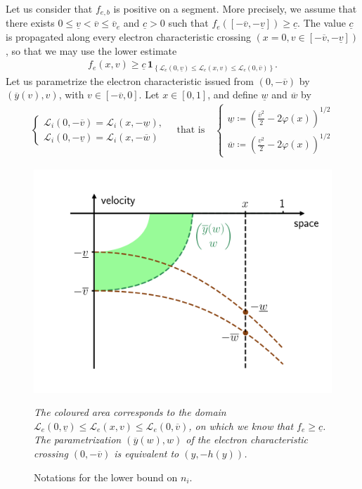 \documentclass{article}
\numberwithin{equation}{section}
\newcommand{\mysubcaption}[1]{
	\vspace*{5pt}
	\begin{minipage}{0.8\linewidth}
		\begin{center}
			\footnotesize\emph{#1}
		\end{center}
	\end{minipage}
}
\newcommand{\ve}{{\overline{v}_e}} %
\newcommand{\domfel}{{\underline{v}}} %
\newcommand{\domfeu}{{\overline{v}}} %
\newcommand{\minfe}{{\underline{c}}} %
\begin{document}
Let us consider that $f_{e,b}$ is positive on a segment. More precisely, we assume that there exists $0 \leqslant \domfel < \domfeu \leqslant \ve$ and $\minfe > 0$ such that $f_e([-\domfeu,-\domfel]) \geqslant \minfe$.
The value $\minfe$ is propagated along every electron characteristic crossing $(x=0,v\in[-\domfeu,-\domfel])$, so that we may use the lower estimate
\begin{align*}
	f_e(x,v) \geqslant \minfe \,\textbf{1}_{\left\{\mathcal{L}_e(0,\domfel) \leqslant \mathcal{L}_e(x,v) \leqslant \mathcal{L}_e(0,\domfeu)\right\}}.
\end{align*}
Let us parametrize the electron characteristic issued from $(0,-\domfeu)$ by $(\overline{y}(v), v)$, with $v\in[-\domfeu,0]$. Let $x\in[0,1]$, and define $\underline{w}$ and $\overline{w}$ by
\begin{align*}
	\begin{cases}
		\mathcal{L}_i(0,-\domfeu) = \mathcal{L}_i(x,-\underline{w}), \\
		\mathcal{L}_i(0,-\domfel) = \mathcal{L}_i(x,-\overline{w})
	\end{cases}
	\quad \text{that is} \quad
	\begin{cases}
		\underline{w} \coloneqq \left(\frac{\domfeu^2}{2} - 2 \varphi(x)\right)^{1/2} \\
		\overline{w} \coloneqq \left(\frac{\domfel^2}{2} - 2 \varphi(x)\right)^{1/2}
	\end{cases}
\end{align*}

\begin{figure}
	\centering
	\includegraphics[width=0.5\linewidth]{images/fpcharmaps_lowerboundni}
	\caption{Notations for the lower bound on $n_i$.}
	\mysubcaption{The coloured area corresponds to the domain $\mathcal{L}_e(0,\domfel) \leqslant \mathcal{L}_e(x,v) \leqslant \mathcal{L}_e(0,\domfeu)$, on which we know that $f_e \geqslant \minfe$. The parametrization $(\overline{y}(w),w)$ of the electron characteristic crossing $(0,-\domfeu)$ is equivalent to $(y,-h(y))$.}
	\label{fig:charmaps_lowerboundni}
\end{figure}
\end{document}
